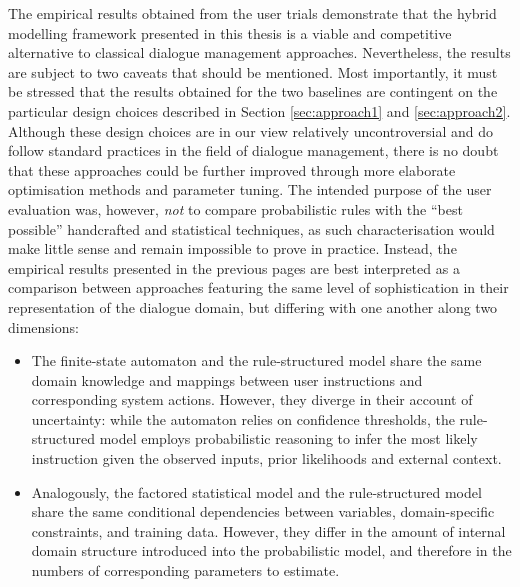 The empirical results obtained from the user trials demonstrate that the hybrid modelling framework presented in this thesis is a viable and competitive alternative to classical dialogue management approaches.  Nevertheless, the results are subject to two caveats that should be mentioned.  Most importantly, it must be stressed that the results obtained for the two baselines are contingent on the particular design choices described in Section \ref{sec:approach1} and \ref{sec:approach2}.  Although these design choices are in our view relatively uncontroversial and do follow standard practices in the field of dialogue management, there is no doubt that these approaches could be further improved through more elaborate optimisation methods and parameter tuning. The intended purpose of the user evaluation was, however, \textit{not} to compare probabilistic rules with the ``best possible'' handcrafted and statistical techniques, as such characterisation would make little sense and remain impossible to prove in practice. Instead, the empirical results presented in the previous pages are best interpreted as a comparison between approaches featuring the same level of sophistication in their representation of the dialogue domain, but differing with one another along two dimensions:
\begin{itemize}
\item The finite-state automaton and the rule-structured model share the same domain knowledge and mappings between user instructions and corresponding system actions.  However, they diverge in their account of uncertainty: while the automaton relies on confidence thresholds, the rule-structured model employs probabilistic reasoning to infer the most likely instruction given the observed inputs, prior likelihoods and external context.
\item Analogously, the factored statistical model and the rule-structured model share the same conditional dependencies between variables, domain-specific constraints, and training data. However, they differ in the amount of internal domain structure introduced into the probabilistic model, and therefore in the numbers of corresponding parameters to estimate.
\end{itemize}

